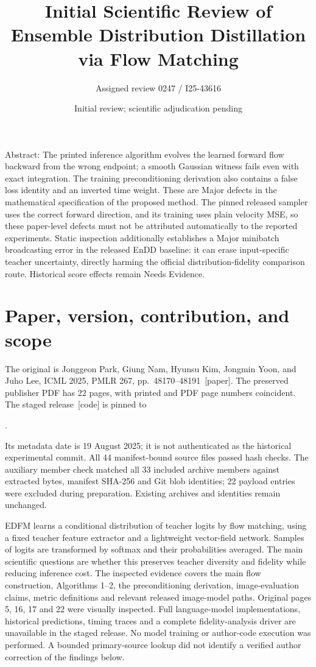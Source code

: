 \documentclass[10pt]{article}
\title{Initial Scientific Review of
Ensemble Distribution Distillation via Flow Matching}
\author{Assigned review 0247 / I25-43616}
\date{Initial review; scientific adjudication pending}
\begin{document}
\maketitle
Abstract: The printed inference algorithm evolves the learned forward flow backward from the wrong endpoint; a smooth Gaussian witness fails even with exact integration. The training preconditioning derivation also contains a false loss identity and an inverted time weight. These are Major defects in the mathematical specification of the proposed method. The pinned released sampler uses the correct forward direction, and its training uses plain velocity MSE, so these paper-level defects must not be attributed automatically to the reported experiments. Static inspection additionally establishes a Major minibatch broadcasting error in the released EnDD baseline: it can erase input-specific teacher uncertainty, directly harming the official distribution-fidelity comparison route. Historical score effects remain Needs Evidence.\par
\section*{Paper, version, contribution, and scope}
The original is Jonggeon Park, Giung Nam, Hyunsu Kim, Jongmin Yoon, and Juho Lee, ICML 2025, PMLR 267, pp. 48170–48191 [paper]. The preserved publisher PDF has 22 pages, with printed and PDF page numbers coincident. The staged release [code] is pinned to\par
.\par
Its metadata date is 19 August 2025; it is not authenticated as the historical experimental commit. All 44 manifest-bound source files passed hash checks. The auxiliary member check matched all 33 included archive members against extracted bytes, manifest SHA-256 and Git blob identities; 22 payload entries were excluded during preparation. Existing archives and identities remain unchanged.\par
EDFM learns a conditional distribution of teacher logits by flow matching, using a fixed teacher feature extractor and a lightweight vector-field network. Samples of logits are transformed by softmax and their probabilities averaged. The main scientific questions are whether this preserves teacher diversity and fidelity while reducing inference cost. The inspected evidence covers the main flow construction, Algorithms 1–2, the preconditioning derivation, image-evaluation claims, metric definitions and relevant released image-model paths. Original pages 5, 16, 17 and 22 were visually inspected. Full language-model implementations, historical predictions, timing traces and a complete fidelity-analysis driver are unavailable in the staged release. No model training or author-code execution was performed. A bounded primary-source lookup did not identify a verified author correction of the findings below.\par
\end{document}
